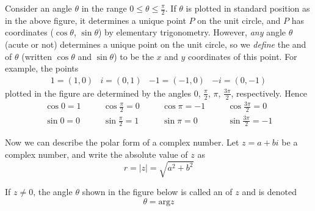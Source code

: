 \documentclass{ximera}
\begin{document}
Consider an angle $\theta$ in the range $0 \leq \theta \leq \frac{\pi}{2}$. If $\theta$ is plotted in standard position as in the above figure, it determines a unique point $P$ on the unit circle, and $P$ has coordinates ($\cos \theta$, $\sin \theta$) by elementary trigonometry. However, \textit{any} angle $\theta$ (acute or not) determines a unique point on the unit circle, so we \textit{define} the  and  of $\theta$ (written $\cos \theta$ and $\sin \theta$) to be the $x$ and $y$ coordinates of this point. For example, the points
\begin{equation*}
\begin{array}{llll}
1=(1,0) & i=(0,1) & -1=(-1,0) & -i=(0,-1)
\end{array}
\end{equation*}
plotted in the figure are determined by the angles $0$, $\frac{\pi}{2}$, $\pi$, $\frac{3\pi}{2}$, respectively. Hence
\begin{equation*}
\begin{array}{lllllll}
\cos 0 = 1 & \quad & \cos \frac{\pi}{2} = 0 & \quad & \cos \pi = -1 & \quad & \cos \frac{3\pi}{2} = 0\\
\sin 0 = 0 & & \sin \frac{\pi}{2} = 1 & & \sin \pi = 0 & &\sin \frac{3\pi}{2} = -1
\end{array}
\end{equation*}

Now we can describe the polar form of a complex number. Let $z = a + bi$ be a complex number, and write the absolute value of $z$ as
\begin{equation*}
r = |z| = \sqrt{a^2+b^2}
\end{equation*}

If $z \neq 0$, the angle $\theta$ shown in the figure below is called an  of $z$ and is denoted
\begin{equation*}
\theta = \mbox{arg} z
\end{equation*}

\begin{center}
\end{center}
\end{document}

